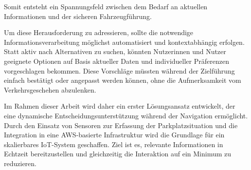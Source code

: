 Somit entsteht ein Spannungsfeld zwischen dem Bedarf an aktuellen Informationen und der sicheren Fahrzeugführung.

Um diese Herausforderung zu adressieren, sollte die notwendige Informationsverarbeitung möglichst automatisiert und kontextabhängig erfolgen.
Statt aktiv nach Alternativen zu suchen, könnten Nutzerinnen und Nutzer geeignete Optionen auf Basis aktueller Daten und individueller Präferenzen vorgeschlagen bekommen.
Diese Vorschläge müssten während der Zielführung einfach bestätigt oder angepasst werden können, ohne die Aufmerksamkeit vom Verkehrsgeschehen abzulenken.

Im Rahmen dieser Arbeit wird daher ein erster Lösungsansatz entwickelt, der eine dynamische Entscheidungsunterstützung während der Navigation ermöglicht.
Durch den Einsatz von Sensoren zur Erfassung der Parkplatzsituation und die Integration in eine \ac{AWS}-basierte Infrastruktur wird die Grundlage für ein skalierbares \ac{IoT}-System geschaffen.
Ziel ist es, relevante Informationen in Echtzeit bereitzustellen und gleichzeitig die Interaktion auf ein Minimum zu reduzieren.